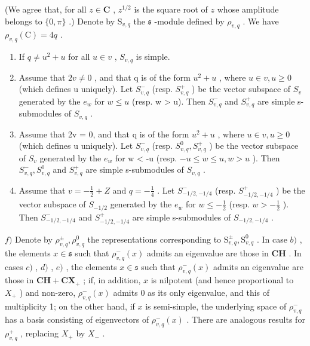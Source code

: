 (We agree that, for all \(z \in \mathbf{C}\) , \(z^{1/2}\) is the square root of \(z\) whose amplitude belongs to \(\{0, \pi\}\) .) Denote by \(\mathrm{S}_{v,q}\) the \(\mathfrak{s}\) -module defined by \(\rho_{v,q}\) . We have \(\rho_{v,q}(\mathrm{C}) = 4q\) .

\begin{enumerate}
\def\labelenumi{\alph{enumi})}
\setcounter{enumi}{1}
\item
  If \(q \neq u^2 + u\) for all \(u \in v\) , \(S_{v,q}\) is simple.
\item
  Assume that \(2v \neq 0\) , and that q is of the form \(u^{2} + u\) , where \(u \in v, u \geq 0\) (which defines u uniquely). Let \(S_{v,q}^{-}\) (resp. \(S_{v,q}^{+}\) ) be the vector subspace of \(S_{v}\) generated by the \(e_{w}\) for \(w \leq u\) (resp. w \textgreater{} u). Then \(S_{v,q}^{-}\) and \(S_{v,q}^{+}\) are simple s-submodules of \(S_{v,q}\) .
\item
  Assume that 2v = 0, and that q is of the form \(u^{2} + u\) , where \(u \in v, u \geq 0\) (which defines u uniquely). Let \(S_{v,q}^{-}\) (resp. \(S_{v,q}^{0}, S_{v,q}^{+}\) ) be the vector subspace of \(S_{v}\) generated by the \(e_{w}\) for w \textless{} -u (resp. \(-u \leq w \leq u, w > u\) ). Then \(S_{v,q}^{-}, S_{v,q}^{0}\) and \(S_{v,q}^{+}\) are simple s-submodules of \(S_{v,q}\) .
\item
  Assume that \(v = -\frac{1}{2} + Z\) and \(q = -\frac{1}{4}\) . Let \(S_{-1/2,-1/4}^{-}\) (resp. \(S_{-1/2,-1/4}^{+}\) ) be the vector subspace of \(S_{-1/2}\) generated by the \(e_{w}\) for \(w \leq -\frac{1}{2}\) (resp. \(w > -\frac{1}{2}\) ). Then \(S_{-1/2,-1/4}^{-}\) and \(S_{-1/2,-1/4}^{+}\) are simple s-submodules of \(S_{-1/2,-1/4}\) .
\end{enumerate}

\(f)\) Denote by \(\rho_{v,q}^{\pm},\rho_{v,q}^{0}\) the representations corresponding to \(\mathrm{S}_{v,q}^{\pm},\mathrm{S}_{v,q}^{0}\) . In case \(b)\) , the elements \(x\in \mathfrak{s}\) such that \(\rho_{v,q}^{-}(x)\) admits an eigenvalue are those in \(\mathbf{CH}\) . In cases \(c)\) , \(d)\) , \(e)\) , the elements \(x\in \mathfrak{s}\) such that \(\rho_{v,q}^{-}(x)\) admits an eigenvalue are those in \(\mathbf{CH} + \mathbf{CX}_+\) ; if, in addition, \(x\) is nilpotent (and hence proportional to \(X_{+}\) ) and non-zero, \(\rho_{v,q}^{-}(x)\) admits 0 as its only eigenvalue, and this of multiplicity 1; on the other hand, if \(x\) is semi-simple, the underlying space of \(\rho_{v,q}^{-}\) has a basis consisting of eigenvectors of \(\rho_{v,q}^{-}(x)\) . There are analogous results for \(\rho_{v,q}^{+}\) , replacing \(X_{+}\) by \(X_{-}\) .

